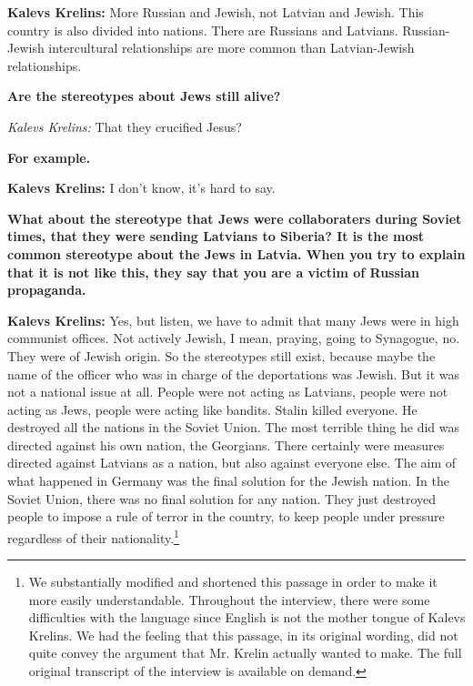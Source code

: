 \textbf{Kalevs Krelins:} More Russian and Jewish, not Latvian and Jewish. This country is also divided into nations. There are Russians and Latvians. Russian-Jewish intercultural relationships are more common than Latvian-Jewish relationships.    

\textbf{Are the stereotypes about Jews still alive?} 

\textit{Kalevs Krelins:} That they crucified Jesus? 

\textbf{For example.}  

\textbf{Kalevs Krelins:} I don’t know, it's hard to say.  

\textbf{What about the stereotype that Jews were collaboraters during Soviet times, that they were sending Latvians to Siberia? It is the most common stereotype about the Jews in Latvia.  When you try to explain that it is not like this, they say that you are a victim of Russian propaganda.}  

\textbf{Kalevs Krelins:} Yes, but listen, we have to admit that many Jews were in high communist offices. Not actively Jewish, I mean, praying, going to Synagogue, no. They were of Jewish origin. So the stereotypes still exist, because maybe the name of the officer who was in charge of the deportations was Jewish. But it was not a national issue at all. People were not acting as Latvians, people were not acting as Jews, people were acting like bandits. Stalin killed everyone. He destroyed all the nations in the Soviet Union. The most terrible thing he did was directed against his own nation, the Georgians. There certainly were measures directed against Latvians as a nation, but also against everyone else. The aim of what happened in Germany was the final solution for the Jewish nation. In the Soviet Union, there was no final solution for any nation. They just destroyed people to impose a rule of terror in the country, to keep people under pressure regardless of their nationality.\footnote{We substantially modified and shortened this passage in order to make it more easily understandable. Throughout the interview, there were some difficulties with the language since English is not the mother tongue of Kalevs Krelins. We had the feeling that this passage, in its original wording, did not quite convey the argument that Mr. Krelin actually wanted to make. The full original transcript of the interview is available on demand.}
